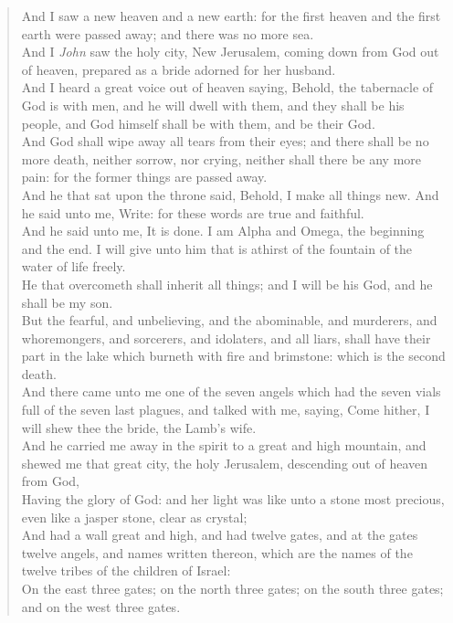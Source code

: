 \documentclass[MAIN]{subfiles}
\begin{document}
\begin{verse}
And I saw a new heaven and a new earth: for the first heaven and the first earth were passed away; and there was no more sea.\\
And I \emph{John} saw the holy city, {\sc New Jerusalem}, coming down from God out of heaven, prepared as a bride adorned for her husband.\\
And I heard a great voice out of heaven saying, Behold, the tabernacle of God is with men, and he will dwell with them, and they shall be his people, and God himself shall be with them, and be their God.\\
And God shall wipe away all tears from their eyes; and there shall be no more death, neither sorrow, nor crying, neither shall there be any more pain: for the former things are passed away.\\
And he that sat upon the throne said, Behold, I make all things new. And he said unto me, Write: for these words are true and faithful.\\
And he said unto me, It is done. I am Alpha and Omega, the beginning and the end. I will give unto him that is athirst of the fountain of the water of life freely.\\
He that overcometh shall inherit all things; and I will be his God, and he shall be my son.\\
But the fearful, and unbelieving, and the abominable, and murderers, and whoremongers, and sorcerers, and idolaters, and all liars, shall have their part in the lake which burneth with fire and brimstone: which is the second death.\\
And there came unto me one of the seven angels which had the seven vials full of the seven last plagues, and talked with me, saying, Come hither, I will shew thee the bride, the Lamb's wife.\\
And he carried me away in the spirit to a great and high mountain, and shewed me that great city, the holy {\sc Jerusalem}, descending out of heaven from God,\\
Having the glory of God: and her light was like unto a stone most precious, even like a jasper stone, clear as crystal;\\
And had a wall great and high, and had twelve gates, and at the gates twelve angels, and names written thereon, which are the names of the twelve tribes of the children of Israel:\\
On the east three gates; on the north three gates; on the south three gates; and on the west three gates.\\

\end{verse}
\end{document}
